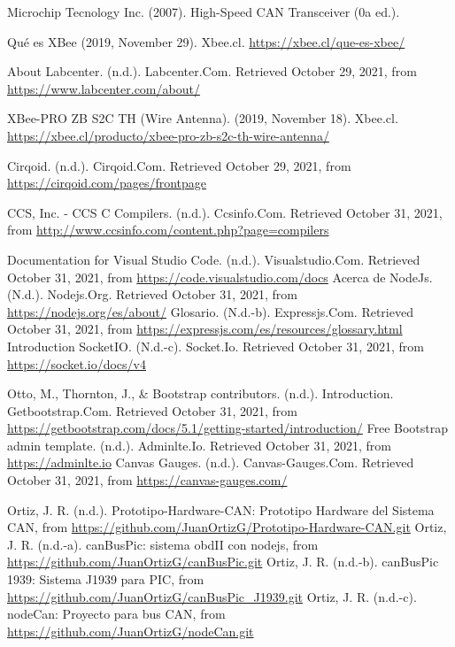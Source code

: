 \begin{thebibliography}{99}
 Microchip Tecnology Inc. (2007). High-Speed CAN Transceiver (0a ed.).

 Qué es XBee (2019, November 29). Xbee.cl. \url{https://xbee.cl/que-es-xbee/} 

 About Labcenter. (n.d.). Labcenter.Com. Retrieved October 29, 2021, from \url{https://www.labcenter.com/about/}

 XBee-PRO ZB S2C TH (Wire Antenna). (2019, November 18). Xbee.cl. \url{ https://xbee.cl/producto/xbee-pro-zb-s2c-th-wire-antenna/}

 Cirqoid. (n.d.). Cirqoid.Com. Retrieved October 29, 2021, from \url{https://cirqoid.com/pages/frontpage}


  CCS, Inc. - CCS C Compilers. (n.d.). Ccsinfo.Com. Retrieved October 31, 2021, from \url{http://www.ccsinfo.com/content.php?page=compilers}

  Documentation for Visual Studio Code. (n.d.). Visualstudio.Com. Retrieved October 31, 2021, from \url{https://code.visualstudio.com/docs}
  Acerca de NodeJs. (N.d.). Nodejs.Org. Retrieved October 31, 2021, from \url{https://nodejs.org/es/about/}
  Glosario. (N.d.-b). Expressjs.Com. Retrieved October 31, 2021, from \url{https://expressjs.com/es/resources/glossary.html}
  Introduction SocketIO. (N.d.-c). Socket.Io. Retrieved October 31, 2021, from \url{https://socket.io/docs/v4}


 Otto, M., Thornton, J., \& Bootstrap contributors. (n.d.). Introduction. Getbootstrap.Com. Retrieved October 31, 2021, from \url{https://getbootstrap.com/docs/5.1/getting-started/introduction/}
 Free Bootstrap admin template. (n.d.). Adminlte.Io. Retrieved October 31, 2021, from \url{https://adminlte.io}
 Canvas Gauges. (n.d.). Canvas-Gauges.Com. Retrieved October 31, 2021, from \url{https://canvas-gauges.com/}



 Ortiz, J. R. (n.d.). Prototipo-Hardware-CAN: Prototipo Hardware del Sistema CAN, from \url{   
   https://github.com/JuanOrtizG/Prototipo-Hardware-CAN.git}
   Ortiz, J. R. (n.d.-a). canBusPic: sistema obdII con nodejs, from \url{https://github.com/JuanOrtizG/canBusPic.git}
 Ortiz, J. R. (n.d.-b). canBusPic 1939: Sistema J1939 para PIC, from  \url{https://github.com/JuanOrtizG/canBusPic_J1939.git}
 Ortiz, J. R. (n.d.-c). nodeCan: Proyecto para bus CAN, from \url{https://github.com/JuanOrtizG/nodeCan.git}






\end{thebibliography}
